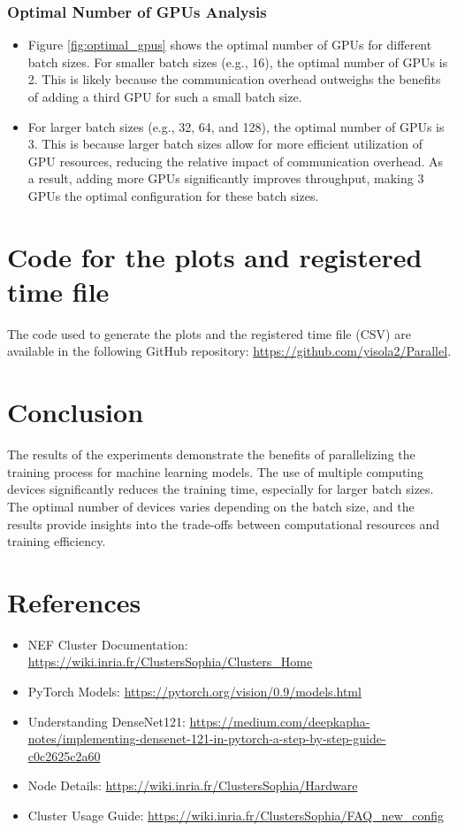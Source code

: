 \documentclass{article}
\begin{document}
\subsubsection{Optimal Number of GPUs Analysis}
\begin{itemize}
    \item Figure \ref{fig:optimal_gpus} shows the optimal number of GPUs for different batch sizes. For smaller batch sizes (e.g., 16), the optimal number of GPUs is 2. This is likely because the communication overhead outweighs the benefits of adding a third GPU for such a small batch size. 
    \item For larger batch sizes (e.g., 32, 64, and 128), the optimal number of GPUs is 3. This is because larger batch sizes allow for more efficient utilization of GPU resources, reducing the relative impact of communication overhead. As a result, adding more GPUs significantly improves throughput, making 3 GPUs the optimal configuration for these batch sizes.
\end{itemize}

\section{Code for the plots and registered time file}
The code used to generate the plots and the registered time file (CSV) are available in the following GitHub repository: \url{https://github.com/yisola2/Parallel}.

\section{Conclusion}
The results of the experiments demonstrate the benefits of parallelizing the training process for machine learning models. The use of multiple computing devices significantly reduces the training time, especially for larger batch sizes. The optimal number of devices varies depending on the batch size, and the results provide insights into the trade-offs between computational resources and training efficiency.

\section*{References}
\begin{itemize}
    \item NEF Cluster Documentation: \url{https://wiki.inria.fr/ClustersSophia/Clusters_Home}
    \item PyTorch Models: \url{https://pytorch.org/vision/0.9/models.html}
    \item Understanding DenseNet121: \url{https://medium.com/deepkapha-notes/implementing-densenet-121-in-pytorch-a-step-by-step-guide-c0c2625c2a60}
    \item Node Details: \url{https://wiki.inria.fr/ClustersSophia/Hardware}
    \item Cluster Usage Guide: \url{https://wiki.inria.fr/ClustersSophia/FAQ_new_config}
\end{itemize}
\end{document}
